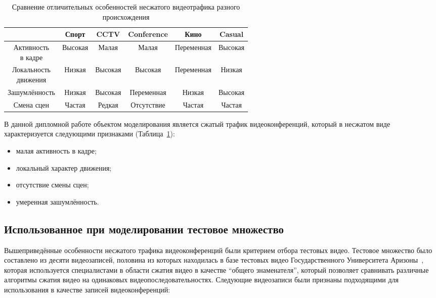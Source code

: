 \begin{table}[ht]
    \caption{Сравнение отличительных особенностей несжатого видеотрафика разного происхождения}
    \centering
    \begin{tabular}{| c | c | c | c | c | c |}
\hline
                      & Спорт    & CCTV     & Conference  & Кино       & Casual  \\
\hline
\specialcell{Активность\\в кадре}    &  Высокая &  Малая   &  Малая      & Переменная & Высокая \\
\hline
\specialcell{Локальность\\движения}  &  Низкая  &  Высокая &  Высокая    & Переменная & Низкая  \\
\hline
Зашумлённость         &  Низкая  &  Высокая &  Переменная & Низкая     & Высокая \\
\hline
Смена сцен            &  Частая  &  Редкая  &  Отсутствие & Частая     & Частая  \\
\hline
    \end{tabular}
    \label{tab:videotypes}
\end{table}

В данной дипломной работе объектом моделирования является
сжатый трафик видеоконференций, который в несжатом виде
характеризуется следующими признаками (Таблица~\ref{tab:videotypes}):

\begin{itemize}
    \item малая активность в кадре;
    \item локальный характер движения;
    \item отсутствие смены сцен;
    \item умеренная зашумлённость.
\end{itemize}

\subsection{Использованное при моделировании тестовое множество}

Вышеприведённые особенности несжатого трафика видеоконференций
были критерием отбора тестовых видео. Тестовое множество было
составлено из десяти видеозаписей, половина из которых
находилась в базе тестовых видео Государственного Университета
Аризоны~\cite{traceas}, которая используется специалистами в области
сжатия видео в качестве ``общего знаменателя'', который позволяет
сравнивать различные алгоритмы сжатия видео на одинаковых
видеопоследовательностях. Следующие видеозаписи были
признаны подходящими для использования в качестве
записей видеоконференций:

